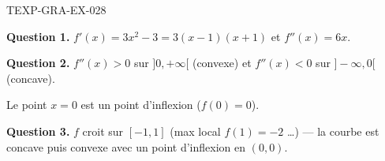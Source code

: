 \begin{corrige}{TEXP-GRA-EX-028}

\textbf{Question 1.} $f'(x) = 3x^2 - 3 = 3(x-1)(x+1)$ et $f''(x) = 6x$.


\textbf{Question 2.} $f''(x) > 0$ sur $]0,+\infty[$ (convexe) et $f''(x) < 0$ sur $]-\infty,0[$ (concave).

Le point $x=0$ est un point d'inflexion ($f(0) = 0$).

\textbf{Question 3.} $f$ croit sur $[-1,1]$ (max local $f(1)=-2$ \ldots) — la courbe est concave puis convexe avec un point d'inflexion en $(0,0)$.

\end{corrige}
